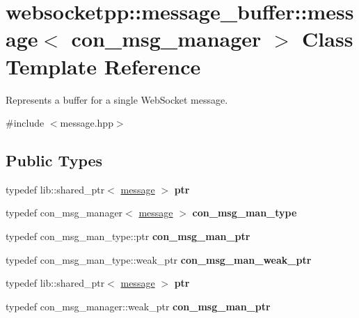 \hypertarget{classwebsocketpp_1_1message__buffer_1_1message}{}\section{websocketpp\+:\+:message\+\_\+buffer\+:\+:message$<$ con\+\_\+msg\+\_\+manager $>$ Class Template Reference}
\label{classwebsocketpp_1_1message__buffer_1_1message}


Represents a buffer for a single Web\+Socket message.  




{\ttfamily \#include $<$message.\+hpp$>$}

\subsection*{Public Types}
\begin{DoxyCompactItemize}
\item 
\mbox{\label{classwebsocketpp_1_1message__buffer_1_1message_adb52b5feb820ec7bc6140cc8be9edd57}} 
typedef lib\+::shared\+\_\+ptr$<$ \mbox{\hyperlink{classwebsocketpp_1_1message__buffer_1_1message}{message}} $>$ {\bfseries ptr}
\item 
\mbox{\label{classwebsocketpp_1_1message__buffer_1_1message_a30657669d087f13475246f946d6b6361}} 
typedef con\+\_\+msg\+\_\+manager$<$ \mbox{\hyperlink{classwebsocketpp_1_1message__buffer_1_1message}{message}} $>$ {\bfseries con\+\_\+msg\+\_\+man\+\_\+type}
\item 
\mbox{\label{classwebsocketpp_1_1message__buffer_1_1message_abb7a33ceab94975c7503102537c33b48}} 
typedef con\+\_\+msg\+\_\+man\+\_\+type\+::ptr {\bfseries con\+\_\+msg\+\_\+man\+\_\+ptr}
\item 
\mbox{\label{classwebsocketpp_1_1message__buffer_1_1message_a54e04850b167306ef4e04ac2612e5c18}} 
typedef con\+\_\+msg\+\_\+man\+\_\+type\+::weak\+\_\+ptr {\bfseries con\+\_\+msg\+\_\+man\+\_\+weak\+\_\+ptr}
\item 
\mbox{\label{classwebsocketpp_1_1message__buffer_1_1message_adb52b5feb820ec7bc6140cc8be9edd57}} 
typedef lib\+::shared\+\_\+ptr$<$ \mbox{\hyperlink{classwebsocketpp_1_1message__buffer_1_1message}{message}} $>$ {\bfseries ptr}
\item 
\mbox{\label{classwebsocketpp_1_1message__buffer_1_1message_a7fff9a702f65dc3f1b75058664833db5}} 
typedef con\+\_\+msg\+\_\+manager\+::weak\+\_\+ptr {\bfseries con\+\_\+msg\+\_\+man\+\_\+ptr}
\end{DoxyCompactItemize}
